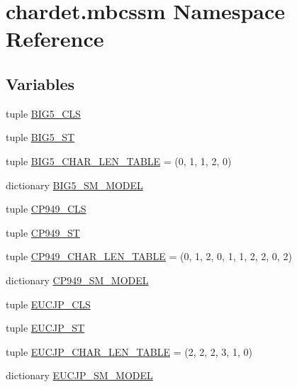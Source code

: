 \hypertarget{namespacechardet_1_1mbcssm}{}\section{chardet.\+mbcssm Namespace Reference}
\label{namespacechardet_1_1mbcssm}
\subsection*{Variables}
\begin{DoxyCompactItemize}
\item 
tuple \hyperlink{namespacechardet_1_1mbcssm_a4e2e02ae8ec6e753edfcf5ad003eee4c}{B\+I\+G5\+\_\+\+C\+LS}
\item 
tuple \hyperlink{namespacechardet_1_1mbcssm_ae20f6b37a0d4e78752f32d2812046421}{B\+I\+G5\+\_\+\+ST}
\item 
tuple \hyperlink{namespacechardet_1_1mbcssm_ab10f95378f2375c3d9a5c206e0f49017}{B\+I\+G5\+\_\+\+C\+H\+A\+R\+\_\+\+L\+E\+N\+\_\+\+T\+A\+B\+LE} = (0, 1, 1, 2, 0)
\item 
dictionary \hyperlink{namespacechardet_1_1mbcssm_a37af70fecbc709e2508c984c2807b5d3}{B\+I\+G5\+\_\+\+S\+M\+\_\+\+M\+O\+D\+EL}
\item 
tuple \hyperlink{namespacechardet_1_1mbcssm_a6e2450931fc68176d355039e9422d029}{C\+P949\+\_\+\+C\+LS}
\item 
tuple \hyperlink{namespacechardet_1_1mbcssm_a816427a2aaa75049d6c48e00856ee6b1}{C\+P949\+\_\+\+ST}
\item 
tuple \hyperlink{namespacechardet_1_1mbcssm_ad4bfcf2466ef775be4f00ab324296fce}{C\+P949\+\_\+\+C\+H\+A\+R\+\_\+\+L\+E\+N\+\_\+\+T\+A\+B\+LE} = (0, 1, 2, 0, 1, 1, 2, 2, 0, 2)
\item 
dictionary \hyperlink{namespacechardet_1_1mbcssm_a40b2519bf1ed456f97288613c795ea39}{C\+P949\+\_\+\+S\+M\+\_\+\+M\+O\+D\+EL}
\item 
tuple \hyperlink{namespacechardet_1_1mbcssm_acc8f33eeb36d4a1df5291f0ed3508a30}{E\+U\+C\+J\+P\+\_\+\+C\+LS}
\item 
tuple \hyperlink{namespacechardet_1_1mbcssm_adbbfe19e955f86ca55e8dcfd4a0bbe1f}{E\+U\+C\+J\+P\+\_\+\+ST}
\item 
tuple \hyperlink{namespacechardet_1_1mbcssm_a85e3044bd5dd4a8f1a32b7585ca95167}{E\+U\+C\+J\+P\+\_\+\+C\+H\+A\+R\+\_\+\+L\+E\+N\+\_\+\+T\+A\+B\+LE} = (2, 2, 2, 3, 1, 0)
\item 
dictionary \hyperlink{namespacechardet_1_1mbcssm_aa2e233fa141721330d30edff69543ac3}{E\+U\+C\+J\+P\+\_\+\+S\+M\+\_\+\+M\+O\+D\+EL}

\end{DoxyCompactItemize}

